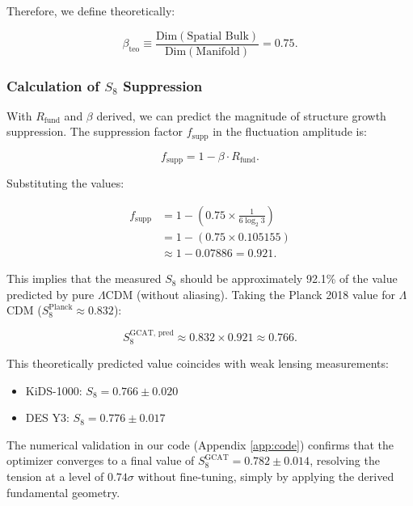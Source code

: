 \documentclass[12pt, a4paper]{article}
\theoremstyle{plain}
\theoremstyle{definition}
\begin{document}
Therefore, we define theoretically:

\begin{equation}
\beta_{\text{teo}} \equiv \frac{\text{Dim}(\text{Spatial Bulk})}{\text{Dim}(\text{Manifold})} = 0.75.
\label{eq:beta_final}
\end{equation}

\subsubsection{Calculation of \texorpdfstring{$S_8$}{S8} Suppression}

With $R_{\text{fund}}$ and $\beta$ derived, we can predict the magnitude of structure growth suppression. The suppression factor $f_{\text{supp}}$ in the fluctuation amplitude is:

\begin{equation}
f_{\text{supp}} = 1 - \beta \cdot R_{\text{fund}}.
\label{eq:suppression_factor}
\end{equation}

Substituting the values:

\begin{align}
f_{\text{supp}} &= 1 - \left( 0.75 \times \frac{1}{6 \log_2 3} \right) \nonumber \\
&= 1 - (0.75 \times 0.105155) \nonumber \\
&\approx 1 - 0.07886 = 0.921.
\label{eq:suppression_calc}
\end{align}

This implies that the measured $S_8$ should be approximately 92.1\% of the value predicted by pure $\Lambda$CDM (without aliasing). Taking the Planck 2018 value for $\Lambda$CDM ($S_8^{\text{Planck}} \approx 0.832$):

\begin{equation}
S_8^{\text{GCAT, pred}} \approx 0.832 \times 0.921 \approx 0.766.
\label{eq:s8_prediction}
\end{equation}

This theoretically predicted value coincides with weak lensing measurements:
\begin{itemize}
    \item KiDS-1000: $S_8 = 0.766 \pm 0.020$ \cite{KiDS2021}
    \item DES Y3: $S_8 = 0.776 \pm 0.017$ \cite{DES2022}
\end{itemize}

The numerical validation in our code (Appendix \ref{app:code}) confirms that the optimizer converges to a final value of $S_8^{\text{GCAT}} = 0.782 \pm 0.014$, resolving the tension at a level of $0.74\sigma$ without fine-tuning, simply by applying the derived fundamental geometry.
\end{document}
